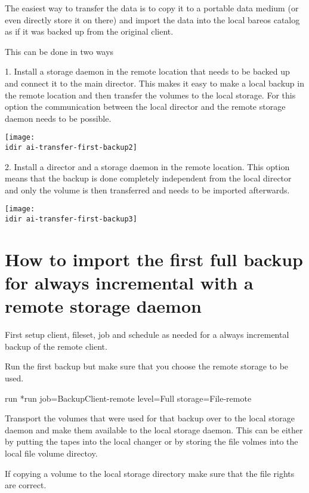 The easiest way to transfer the data is to copy it to a portable 
data medium (or even directly store it on there) and import the 
data into the local bareos catalog as if it was backed up from the 
original client.


This can be done in two ways

1. Install a storage daemon in the remote location that needs to be backed up and connect it to the main director.
   This makes it easy to make a local backup in the remote location and then transfer the volumes to the local storage.
   For this option the communication between the local director and the remote storage daemon needs to be possible.

\begin{center}
\texttt{[image: \\idir ai-transfer-first-backup2]}
\end{center}

2. Install a director and a storage daemon in the remote location.
   This option means that the backup is done completely independent from the local director and only the volume is then transferred and needs to be imported afterwards. 

\begin{center}
\texttt{[image: \\idir ai-transfer-first-backup3]}
\end{center}


\section{How to import the first full backup for always incremental with a remote storage daemon}


First setup client, fileset, job and schedule as needed for a always incremental backup of the remote client.


Run the first backup but make sure that you choose the remote storage to be used.


\begin{bconsole}{run}
*run job=BackupClient-remote level=Full storage=File-remote
\end{bconsole}



Transport the volumes that were used for that backup over to the local storage daemon and make them available to the local storage daemon. This can be either by putting the tapes into the local changer or by storing the file volmes into the local file volume directoy.

If copying a volume to the local storage directory make sure that the file rights are correct.


